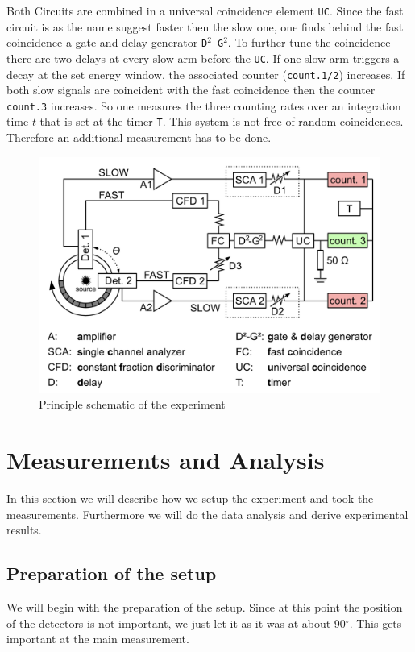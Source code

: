 \documentclass[11pt,a4paper,notitlepage]{scrartcl}
\begin{document}
Both Circuits are combined in a universal coincidence element \texttt{UC}. Since the fast circuit is as the name suggest faster then the slow one, one finds behind the fast coincidence a gate and delay generator \texttt{D$^2$-G$^2$}. To further tune the coincidence there are two delays at every slow arm before the \texttt{UC}. If one slow arm triggers a decay at the set energy window, the associated counter (\texttt{count.1/2}) increases. If both slow signals are coincident with the fast coincidence then the counter \texttt{count.3} increases. So one measures the three counting rates over an integration time $t$ that is set at the timer \texttt{T}. This system is not free of random coincidences. Therefore an additional measurement has to be done.

\begin{figure}[htpb]
	\centering
	\includegraphics[width=0.7\linewidth]{./figs/Setup.png}
	\caption{Principle schematic of the experiment \cite{manual}}\label{fig:aufbau}
\end{figure}

\section{Measurements and Analysis}
\label{sec:anal}
In this section we will describe how we setup the experiment and took the measurements. Furthermore we will do the data analysis and derive experimental results.

\subsection{Preparation of the setup}
We will begin with the preparation of the setup. Since at this point the position of the detectors is not important, we just let it as it was at about 90$^\circ$. This gets important at the main measurement.
\end{document}
